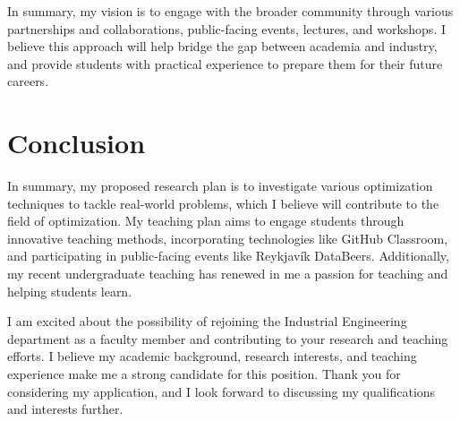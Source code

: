\documentclass[]{cv} %
\begin{document}
In summary, my vision is to engage with the broader community through various partnerships and collaborations, public-facing events, lectures, and workshops. I believe this approach will help bridge the gap between academia and industry, and provide students with practical experience to prepare them for their future careers.


\section{Conclusion}
In summary, my proposed research plan is to investigate various optimization techniques to tackle real-world problems, which I believe will contribute to the field of optimization. My teaching plan aims to engage students through innovative teaching methods, incorporating technologies like GitHub Classroom, and participating in public-facing events like Reykjavík DataBeers. Additionally, my recent undergraduate teaching has renewed in me a passion for teaching and helping students learn.

I am excited about the possibility of rejoining the Industrial Engineering department as a faculty member and contributing to your research and teaching efforts. I believe my academic background, research interests, and teaching experience make me a strong candidate for this position. Thank you for considering my application, and I look forward to discussing my qualifications and interests further.
\end{document}
